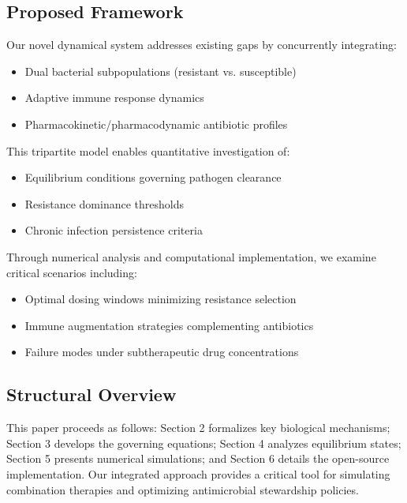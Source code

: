 	\subsection{Proposed Framework}
	Our novel dynamical system addresses existing gaps by concurrently integrating:
	\begin{itemize}
		\item Dual bacterial subpopulations (resistant vs. susceptible)
		\item Adaptive immune response dynamics
		\item Pharmacokinetic/pharmacodynamic antibiotic profiles
	\end{itemize}
	This tripartite model enables quantitative investigation of:
	\begin{itemize}
		\item Equilibrium conditions governing pathogen clearance
		\item Resistance dominance thresholds
		\item Chronic infection persistence criteria
	\end{itemize}
	Through numerical analysis and computational implementation, we examine critical scenarios including:
	\begin{itemize}
		\item Optimal dosing windows minimizing resistance selection
		\item Immune augmentation strategies complementing antibiotics
		\item Failure modes under subtherapeutic drug concentrations
	\end{itemize}
	
	\subsection{Structural Overview}
	This paper proceeds as follows: Section 2 formalizes key biological mechanisms; Section 3 develops the governing equations; Section 4 analyzes equilibrium states; Section 5 presents numerical simulations; and Section 6 details the open-source implementation. Our integrated approach provides a critical tool for simulating combination therapies and optimizing antimicrobial stewardship policies.
